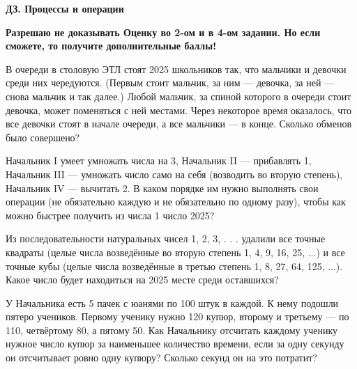 \centerline{\bf \Huge ДЗ. Процессы и операции}
\centerline{\bf \Huge }

\begin{flushright}
        \scriptsize{\textbf{Разрешаю не доказывать Оценку во 2-ом и в 4-ом задании. Но если сможете, то получите дополнительные баллы!}}
\end{flushright}

 В очереди в столовую ЭТЛ стоят 2025 школьников так, что
мальчики и девочки среди них чередуются. (Первым стоит мальчик, за ним — девочка, за
ней — снова мальчик и так далее.) Любой мальчик, за спиной которого в очереди стоит девочка, может
поменяться с ней местами. Через некоторое время оказалось, что все девочки стоят в начале
очереди, а все мальчики — в конце. Сколько обменов было совершено?

 Начальник I умеет умножать числа на 3, Начальник II — прибавлять 1, Начальник III — умножать число само на себя (возводить во вторую степень), Начальник IV — вычитать 2. В каком порядке им нужно выполнять свои операции (не обязательно каждую и не обязательно по одному разу), чтобы как можно быстрее получить из числа 1 число 2025?

 Из последовательности натуральных
чисел 1, 2, 3, . . . удалили все точные квадраты (целые числа возведённые во вторую степень 1, 4, 9, 16, 25, ...) и все точные кубы (целые числа возведённые в третью степень 1, 8, 27, 64, 125, ...). Какое число будет
находиться на 2025 месте среди оставшихся?

 У Начальника есть 5 пачек с юанями по 100 штук в каждой. К нему
подошли пятеро учеников. Первому ученику нужно 120 купюр, второму и третьему — по
110, четвёртому 80, а пятому 50. Как Начальнику отсчитать каждому ученику нужное число купюр за наименьшее количество времени, если за одну секунду он отсчитывает ровно одну купюру? Сколько секунд он на это потратит?




